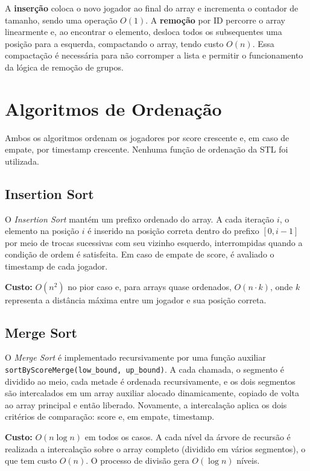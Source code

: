 \documentclass[11pt,a4paper]{article}
\begin{document}
A \textbf{inserção} coloca o novo jogador ao final do array e incrementa o contador de tamanho, sendo uma operação $O(1)$. A \textbf{remoção} por ID percorre o array linearmente e, ao encontrar o elemento, desloca todos os subsequentes uma posição para a esquerda, compactando o array, tendo custo $O(n)$. Essa compactação é necessária para não corromper a lista e permitir o funcionamento da lógica de remoção de grupos.

\section{Algoritmos de Ordenação}
 
Ambos os algoritmos ordenam os jogadores por score crescente e, em caso de empate, por
timestamp crescente. Nenhuma função de ordenação da STL foi utilizada.
 
\subsection{Insertion Sort}
 
O \textit{Insertion Sort} mantém um prefixo ordenado do array. A cada iteração $i$, o elemento na posição $i$ é inserido na posição correta dentro do prefixo $[0, i-1]$ por meio de trocas sucessivas com seu vizinho esquerdo, interrompidas quando a condição de ordem é satisfeita. Em caso de empate de score, é avaliado o timestamp de cada jogador.
 
\textbf{Custo:} $O(n^2)$ no pior caso e, para arrays quase ordenados, $O(n \cdot k)$, onde $k$ representa a distância máxima entre um jogador e sua posição correta.

\subsection{Merge Sort}
 
O \textit{Merge Sort} é implementado recursivamente por uma função auxiliar \texttt{sortByScoreMerge(low\_bound, up\_bound)}. A cada chamada, o segmento é dividido ao meio, cada metade é ordenada recursivamente, e os dois segmentos são intercalados em um array auxiliar alocado dinamicamente, copiado de volta ao array principal e então liberado. Novamente, a intercalação aplica os dois critérios de comparação: score e, em empate, timestamp.
 
\textbf{Custo:} $O(n \log n)$ em todos os casos. A cada nível da árvore de recursão é realizada a intercalação sobre o array completo (dividido em vários segmentos), o que tem custo $O(n)$. O processo de divisão gera $O(\log n)$ níveis. 
\end{document}
